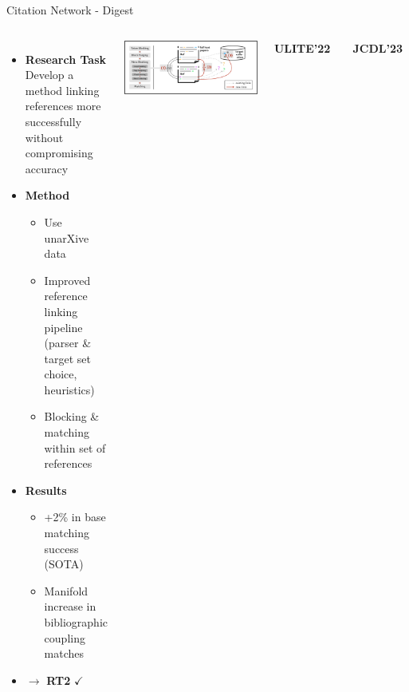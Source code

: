 \documentclass[en,16:9,smallfoot]{sdqbeamer}
\begin{document}
   \begin{frame}{Citation Network - Digest}

   \begin{columns}
        \begin{itemize}
            \item \textbf{Research Task}\\Develop a method linking references more successfully without compromising accuracy
            \item \textbf{Method}
            \begin{itemize}
                \item Use unarXive data
                \item Improved reference linking pipeline\\(parser \& target set choice, heuristics)
                \item Blocking \& matching within set of references
            \end{itemize}
            \item \textbf{Results}
            \begin{itemize}
                \item +2\% in base matching success (SOTA)
                \item Manifold increase in bibliographic coupling matches
            \end{itemize}
            \item $\rightarrow$ \textbf{RT2} $\checkmark$
        \end{itemize}
            \includegraphics[width=\linewidth]{imgs/blocking_schema}
           \begin{infobox-pub-small}
           \textbf{ULITE'22}~\cite{Saier2022ULITE}
           \end{infobox-pub-small}
           \vspace{-0.5em}
           \begin{infobox-pub-small}
           \textbf{JCDL'23}~\cite{Saier2023unarXive}
           \end{infobox-pub-small}
   \end{columns}
   \end{frame}
\end{document}

